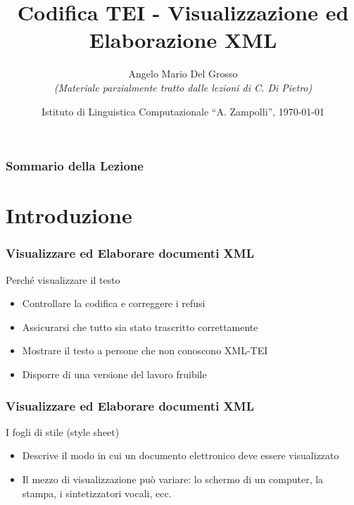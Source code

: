 \documentclass{beamer}
\title{Codifica TEI - Visualizzazione ed Elaborazione XML}
\author[A.M. Del Grosso]{Angelo Mario Del Grosso \\ \tiny\textit{(Materiale parzialmente tratto dalle lezioni di C. Di Pietro)}}
\institute{\texttt{angelo.delgrosso@ilc.cnr.it} \\\textit{CNR-ILC-LicoLab} \\\url{http://licolab.ilc.cnr.it/}}
\date{Istituto di Linguistica Computazionale ``A. Zampolli'', \today}
\begin{document}
    
    \begin{frame}
        \maketitle
    \end{frame}
    
    \begin{frame}
        \frametitle{Sommario della Lezione}
        \tableofcontents
    \end{frame}
    
    \section{Introduzione}
    
    \begin{frame}
        \frametitle{Visualizzare ed Elaborare documenti XML}
        \addtocounter{nframe}{1}
        

         \begin{block}{Perché visualizzare il testo}
             \begin{itemize}
                \item Controllare la codifica e correggere i refusi
                \item Assicurarsi che tutto sia stato trascritto correttamente
                \item Mostrare il testo a persone che non conoscono XML-TEI
                \item Disporre di una versione del lavoro fruibile
            \end{itemize}
         \end{block}
        
    \end{frame}
    
    \begin{frame}
        \frametitle{Visualizzare ed Elaborare documenti XML}
        \addtocounter{nframe}{1}
        
        \begin{block}{I fogli di stile (style sheet)}
           \begin{itemize}
               \item Descrive il modo in cui un documento elettronico deve essere visualizzato
               \item Il mezzo di visualizzazione può variare: lo schermo di un computer, la stampa, i sintetizzatori vocali, ecc.
           \end{itemize}
        \end{block}
        
    \end{frame}
    
\end{document}
